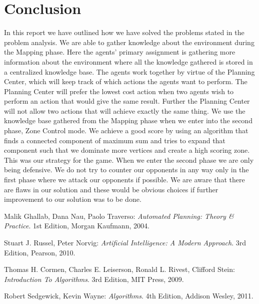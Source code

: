 \documentclass[11pt]{article}
\begin{document}
\section{Conclusion}
In this report we have outlined how we have solved the problems stated in the problem analysis. We are able to gather knowledge about the environment during the Mapping phase. Here the agents' primary assignment is gathering more information about the environment where all the knowledge gathered is stored in a centralized knowledge base. The agents work together by virtue of the Planning Center, which will keep track of which actions the agents want to perform. The Planning Center will prefer the lowest cost action when two agents wish to perform an action that would give the same result. Further the Planning Center will not allow two actions that will achieve exactly the same thing. We use the knowledge base gathered from the Mapping phase when we enter into the second phase, Zone Control mode. We achieve a good score by using an algorithm that finds a connected component of maximum sum and tries to expand that component such that we dominate more vertices and create a high scoring zone. This was our strategy for the game. When we enter the second phase we are only being defensive. We do not try to counter our opponents in any way only in the first phase where we attack our opponents if possible. We are aware that there are flaws in our solution and these would be obvious choices if further improvement to our solution was to be done.

\begin{thebibliography}{9}

	Malik Ghallab, Dana Nau, Paolo Traverso:
	\emph{Automated Planning: Theory \& Practice}.
	1st Edition,
	Morgan Kaufmann,
	2004.

 	Stuart J. Russel, Peter Norvig:
 	\emph{Artificial Intelligence: A Modern Approach}.
	3rd Edition, 	
	Pearson,
	2010.
	
 	Thomas H. Cormen, Charles E. Leiserson, Ronald L. Rivest, Clifford Stein:
	\emph{Introduction To Algorithms}.
	3rd Edition, 	
	MIT Press,
	2009.
	
 	Robert Sedgewick, Kevin Wayne:
	\emph{Algorithms}.
	4th Edition, 	
	Addison Wesley,
	2011.

\end{thebibliography}
\end{document}
